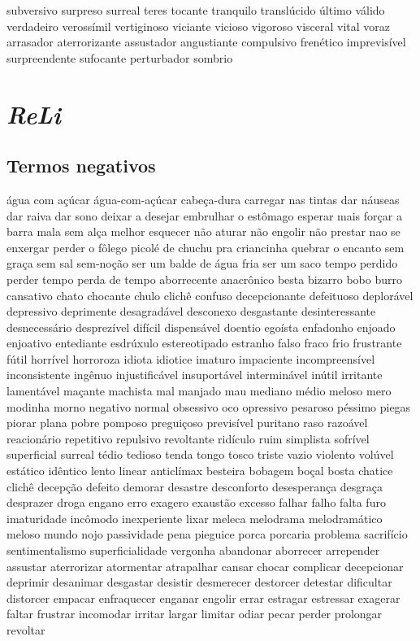 subversivo surpreso surreal teres tocante tranquilo transl\'{u}cido \'{u}ltimo v\'{a}lido verdadeiro veross\'{i}mil vertiginoso viciante vicioso vigoroso visceral vital voraz arrasador aterrorizante assustador angustiante compulsivo fren\'{e}tico imprevis\'{i}vel surpreendente sufocante perturbador sombrio

\section{\textit{ReLi}}
\subsection{Termos negativos}
\'{a}gua com a\c{c}\'{u}car \'{a}gua-com-a\c{c}\'{u}car cabe\c{c}a-dura carregar nas tintas dar n\'{a}useas dar raiva dar sono deixar a desejar embrulhar o est\^{o}mago esperar mais for\c{c}ar a barra mala sem al\c{c}a melhor esquecer n\~ao aturar n\~ao engolir n\~ao prestar nao se enxergar perder o f\^{o}lego picol\'{e} de chuchu pra criancinha quebrar o encanto sem gra\c{c}a sem sal sem-no\c{c}\~ao ser um balde de \'{a}gua fria ser um saco tempo perdido perder tempo perda de tempo aborrecente anacr\^{o}nico besta bizarro bobo burro cansativo chato chocante chulo clich\^{e} confuso decepcionante defeituoso deplor\'{a}vel depressivo deprimente desagrad\'{a}vel desconexo desgastante desinteressante desnecess\'{a}rio desprez\'{i}vel dif\'{i}cil dispens\'{a}vel doentio ego\'{i}sta enfadonho enjoado enjoativo entediante esdr\'{u}xulo estereotipado estranho falso fraco frio frustrante f\'{u}til horr\'{i}vel horroroza idiota idiotice imaturo impaciente incompreens\'{i}vel inconsistente ing\^{e}nuo injustific\'{a}vel insuport\'{a}vel intermin\'{a}vel in\'{u}til irritante lament\'{a}vel ma\c{c}ante machista mal manjado mau mediano m\'{e}dio meloso mero modinha morno negativo normal obsessivo oco opressivo pesaroso p\'{e}ssimo piegas piorar plana pobre pomposo pregui\c{c}oso previs\'{i}vel puritano raso razo\'{a}vel reacion\'{a}rio repetitivo repulsivo revoltante rid\'{i}culo ruim simplista sofr\'{i}vel superficial surreal t\'{e}dio tedioso tenda tongo tosco triste vazio violento vol\'{u}vel est\'{a}tico id\^{e}ntico lento linear anticl\'{i}max besteira bobagem bo\c{c}al bosta chatice clich\^{e} decep\c{c}\~ao defeito demorar desastre desconforto desesperan\c{c}a desgra\c{c}a desprazer droga engano erro exagero exaust\~ao excesso falhar falho falta furo imaturidade inc\^{o}modo inexperiente lixar meleca melodrama melodram\'{a}tico meloso mundo nojo passividade pena pieguice porca porcaria problema sacrif\'{i}cio sentimentalismo superficialidade vergonha abandonar aborrecer arrepender assustar aterrorizar atormentar atrapalhar cansar chocar complicar decepcionar deprimir desanimar desgastar desistir desmerecer destorcer detestar dificultar distorcer empacar enfraquecer enganar engolir errar estragar estressar exagerar faltar frustrar incomodar irritar largar limitar odiar pecar perder prolongar revoltar


